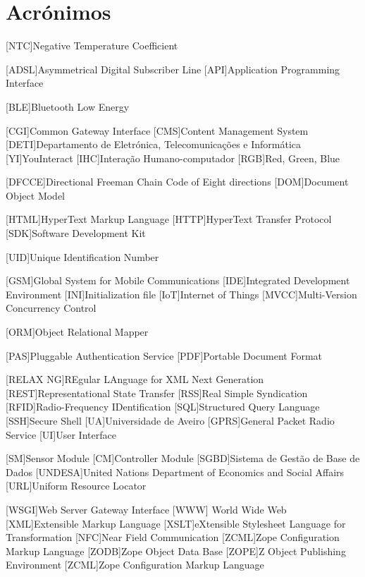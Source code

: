 \chapter*{Acrónimos}

	\begin{acronym}[RELAX NG]
		
		[NTC]{Negative Temperature Coefficient}
				
		{Asymmetrical Digital Subscriber Line}
		[API]{Application Programming Interface}
		
		[BLE]{Bluetooth Low Energy}
		
		[CGI]{Common Gateway Interface}
		[CMS]{Content Management System}
		{Departamento de Eletrónica, Telecomunicações e Informática  }
		[YI]{YouInteract}		
		[IHC]{Interação Humano-computador}	
        [RGB]{Red, Green, Blue}
        
		[DFCCE]{Directional Freeman Chain Code of Eight directions}
		[DOM]{Document Object Model}
		
		{HyperText Markup Language}
		{HyperText Transfer Protocol}		
		[SDK]{Software Development Kit}
        
        [UID]{Unique Identification Number}
        
        
        [GSM]{Global System for Mobile Communications}
		[IDE]{Integrated Development Environment}
		[INI]{Initialization file}	
		[IoT]{Internet of Things}			
		{Multi-Version Concurrency Control}		

		[ORM]{Object Relational Mapper}
		
		[PAS]{Pluggable Authentication Service}
		[PDF]{Portable Document Format}
		
		[RELAX NG]{REgular LAnguage for XML Next Generation}
		{Representational State Transfer}
		[RSS]{Real Simple Syndication}
		{Radio-Frequency IDentification}
		[SQL]{Structured Query Language}		
		[SSH]{Secure Shell}
		[UA]{Universidade de Aveiro}
        [GPRS]{General Packet Radio Service}
		[UI]{User Interface}
		
		[SM]{Sensor Module}
		[CM]{Controller Module}
		{Sistema de Gestão de Base de Dados}
		[UNDESA]{United Nations Department of Economics and Social Affairs}
		[URL]{Uniform Resource Locator}
		
		{Web Server Gateway Interface}
		[WWW]{ World Wide Web}
		[XML]{Extensible Markup Language}
		{eXtensible Stylesheet Language for Transformation}
		[NFC]{Near Field Communication}
		{Zope Configuration Markup Language}
		{Zope Object Data Base}
		{Z Object Publishing Environment}
		{Zope Configuration Markup Language}
	\end{acronym}